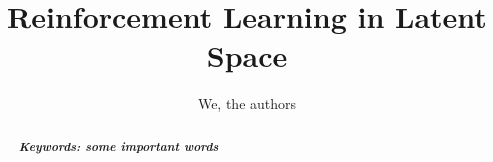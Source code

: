 \documentclass[11pt]{article}
\title{Reinforcement Learning in Latent Space}
\author{We, the authors}
\begin{document}
\maketitle
\begin{abstract}

\lipsum[1]

{{\it \bf Keywords: some important words}}
\end{abstract}







{\tiny\printbibliography}

\clearpage
\raggedbottom
\appendix
\begin{appendix}
\end{appendix}
\end{document}
